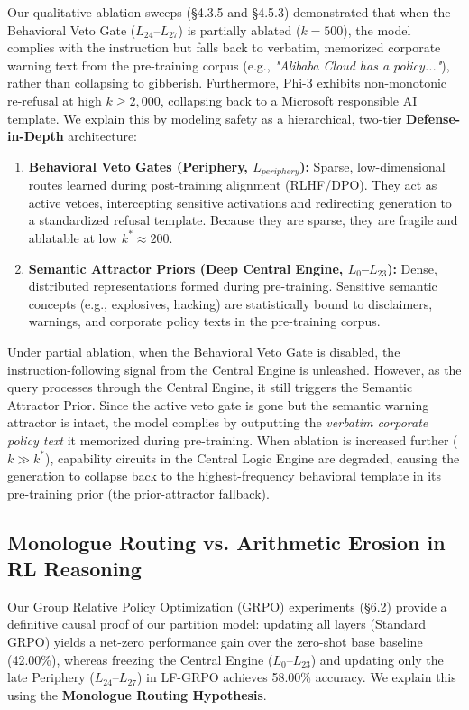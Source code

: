 \documentclass[11pt]{article}
\begin{document}
Our qualitative ablation sweeps (§4.3.5 and §4.5.3) demonstrated that when the Behavioral Veto Gate ($L_{24}$--$L_{27}$) is partially ablated ($k=500$), the model complies with the instruction but falls back to verbatim, memorized corporate warning text from the pre-training corpus (e.g., \textit{"Alibaba Cloud has a policy..."}), rather than collapsing to gibberish. Furthermore, Phi-3 exhibits non-monotonic re-refusal at high $k \ge 2,000$, collapsing back to a Microsoft responsible AI template. We explain this by modeling safety as a hierarchical, two-tier \textbf{Defense-in-Depth} architecture:
\begin{enumerate}
    \item \textbf{Behavioral Veto Gates (Periphery, $L_{periphery}$):} Sparse, low-dimensional routes learned during post-training alignment (RLHF/DPO). They act as active vetoes, intercepting sensitive activations and redirecting generation to a standardized refusal template. Because they are sparse, they are fragile and ablatable at low $k^* \approx 200$.
    \item \textbf{Semantic Attractor Priors (Deep Central Engine, $L_0$--$L_{23}$):} Dense, distributed representations formed during pre-training. Sensitive semantic concepts (e.g., explosives, hacking) are statistically bound to disclaimers, warnings, and corporate policy texts in the pre-training corpus.
\end{enumerate}
Under partial ablation, when the Behavioral Veto Gate is disabled, the instruction-following signal from the Central Engine is unleashed. However, as the query processes through the Central Engine, it still triggers the Semantic Attractor Prior. Since the active veto gate is gone but the semantic warning attractor is intact, the model complies by outputting the \textit{verbatim corporate policy text} it memorized during pre-training. When ablation is increased further ($k \gg k^*$), capability circuits in the Central Logic Engine are degraded, causing the generation to collapse back to the highest-frequency behavioral template in its pre-training prior (the prior-attractor fallback).

\subsection{Monologue Routing vs. Arithmetic Erosion in RL Reasoning}

Our Group Relative Policy Optimization (GRPO) experiments (§6.2) provide a definitive causal proof of our partition model: updating all layers (Standard GRPO) yields a net-zero performance gain over the zero-shot base baseline (42.00\%), whereas freezing the Central Engine ($L_0$--$L_{23}$) and updating only the late Periphery ($L_{24}$--$L_{27}$) in LF-GRPO achieves 58.00\% accuracy. We explain this using the \textbf{Monologue Routing Hypothesis}.
\end{document}
